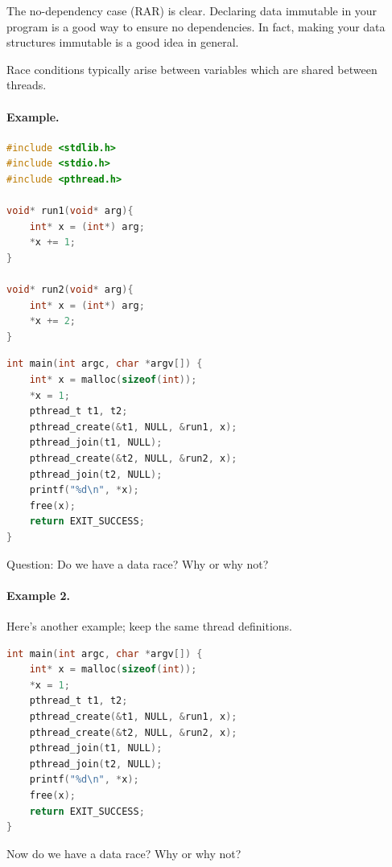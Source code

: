 \documentclass[a4paper]{report}
\begin{document}
The no-dependency case (RAR) is clear. Declaring data immutable 
in your program is a good way to ensure no dependencies. In fact, making your data structures immutable is a good idea in general.


Race conditions typically arise between variables which are shared
between threads.

\paragraph{Example.}
\begin{multicols}{2}
\begin{lstlisting}[language=C]
#include <stdlib.h>
#include <stdio.h>
#include <pthread.h>

void* run1(void* arg){
    int* x = (int*) arg;
    *x += 1;
}

void* run2(void* arg){
    int* x = (int*) arg;
    *x += 2;
}
\end{lstlisting}
\columnbreak
\begin{lstlisting}[language=C]
int main(int argc, char *argv[]) {
    int* x = malloc(sizeof(int));
    *x = 1;
    pthread_t t1, t2;
    pthread_create(&t1, NULL, &run1, x);
    pthread_join(t1, NULL);
    pthread_create(&t2, NULL, &run2, x);
    pthread_join(t2, NULL);
    printf("%d\n", *x);
    free(x);
    return EXIT_SUCCESS;
}
\end{lstlisting}
\end{multicols}

\noindent
Question: Do we have a data race? Why or why not?
\vspace*{2em}

\paragraph{Example 2.} Here's another example; keep the same thread definitions.
\begin{lstlisting}[language=C]
int main(int argc, char *argv[]) {
    int* x = malloc(sizeof(int));
    *x = 1;
    pthread_t t1, t2;
    pthread_create(&t1, NULL, &run1, x);
    pthread_create(&t2, NULL, &run2, x);
    pthread_join(t1, NULL);
    pthread_join(t2, NULL);
    printf("%d\n", *x);
    free(x);
    return EXIT_SUCCESS;
}
\end{lstlisting}

Now do we have a data race? Why or why not?
\vspace*{2em}
\end{document}
